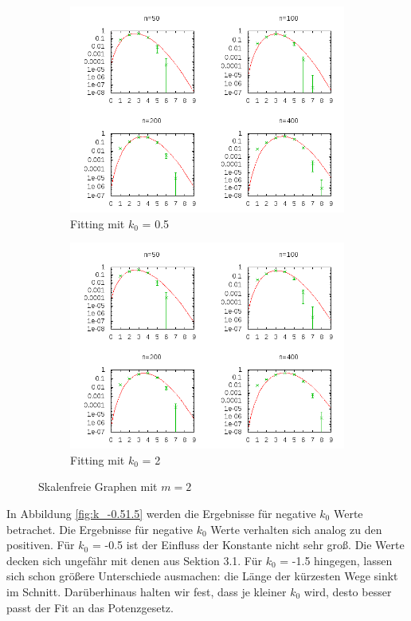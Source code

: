 \documentclass[10pt]{article}
\begin{document}
\begin{figure}[h!]
\begin{subfigure}{.5\textwidth}
  \centering
  \includegraphics[width=1\linewidth]{../Results/Power_constant_k05.png}
  \caption{Fitting mit $k_0$ = 0.5}
\end{subfigure}%
\begin{subfigure}{.5\textwidth}
  \centering
  \includegraphics[width=1\linewidth]{../Results/Power_constant_k2.png}
  \caption{Fitting mit $k_0$ = 2}
\end{subfigure}
\caption{Skalenfreie Graphen mit $m=2$}
\label{fig:k_0.52}
\end{figure}

In Abbildung \ref{fig:k_-0.51.5} werden die Ergebnisse für negative $k_0$ Werte betrachet. Die Ergebnisse für negative $k_0$ Werte verhalten sich analog zu den positiven. Für $k_0$ = -0.5 ist der Einfluss der Konstante nicht sehr groß. Die Werte decken sich ungefähr mit denen aus Sektion 3.1. Für $k_0$ = -1.5 hingegen, lassen sich schon größere Unterschiede ausmachen: die Länge der kürzesten Wege sinkt im Schnitt. Darüberhinaus halten wir fest, dass je kleiner $k_0$ wird, desto besser passt der Fit an das Potenzgesetz.
\end{document}
